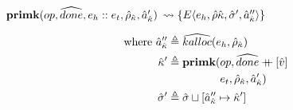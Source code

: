 \documentclass[12pt,draft]{article}
\newcommand\mdoubleplus{\ensuremath{\mathbin{+\mkern-9mu+}}}
\begin{document}
\begin{multicols*}{2}
\begin{center}
  $\textbf{primk}(op, \widehat{done} , e_h::e_t , \hat{\rho}_{\hat{\kappa}} , \hat{a}_{\hat{\kappa}}')$
  $\leadsto \{E\langle e_h , \hat{\rho}{\hat{\kappa}} , \hat{\sigma}' , \hat{a}_{\hat{\kappa}}'' \rangle\}$
\end{center}
\vspace{-7mm}
\begin{align*}
  \text{where }
  \akaddr'' &\triangleq \akalloc{e_h , \aenv_{\akont}} \\
  \akont' &\triangleq \textbf{primk}(op, \adone \mdoubleplus [\aval] \\
            &\;\;\;\;\;\;\;\;\;\;\;\;\;\;\;\;\; e_t , \aenv_{\akont} , \akaddr') \\
  \astore' &\triangleq \astore \sqcup [\akaddr'' \mapsto \akont']
\end{align*}
\end{multicols*}


\newpage
\end{document}
